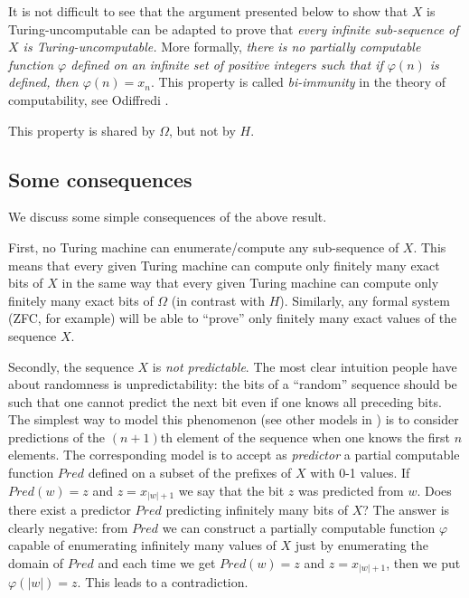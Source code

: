 \documentclass[pra,amsfonts,preprint,showkeys]{revtex4}
\begin{document}
It is not difficult to see that the argument presented below  to show that $X$
is Turing-uncomputable can be adapted to prove that {\it every infinite sub-sequence of $X$ is Turing-uncomputable.}
More formally, {\it there is no partially computable function $\varphi$
defined on an infinite set of positive integers such that if $\varphi (n)$ is defined, then $\varphi (n) = x_{n}$}. This property is called {\it bi-immunity} in the theory of computability, see Odiffredi \cite{odi:99}.

This property is shared by $\Omega$, but not by $H$.




\subsection{Some consequences}

We discuss some simple consequences of the above result.

First, no Turing machine can enumerate/compute any sub-sequence
of  $X$. This means that every given Turing machine can compute only finitely many exact bits of $X$ in the same way that every given Turing machine can compute only finitely many exact bits of $\Omega$ (in contrast with $H$). Similarly, any formal system (ZFC, for example) will be able to ``prove'' only finitely many exact values of the sequence $X$.





Secondly, the sequence $X$ is {\it not predictable}. The most clear intuition people  have about randomness is unpredictability:
the  bits of a ``random'' sequence  should be such that one cannot predict the next bit even if one knows all preceding bits.  The simplest way to model this phenomenon (see  other models in \cite{DH}) is to consider
predictions of the $(n+1)$th element of the sequence when one knows the first $n$ elements. The corresponding model is to accept as  {\it predictor} a partial computable function $Pred$ defined on  a subset of the prefixes of $X$
 with 0-1 values.  If $Pred(w)= z$ and $z= x_{|w|+1}$ we say that the bit $z$
 was predicted from  $w$.
Does there
exist a predictor $Pred$ predicting infinitely many bits of $X$? The answer is clearly negative: from $Pred$ we can construct a partially computable function $\varphi$ capable of enumerating infinitely many
values of $X$ just by enumerating the domain of $Pred$ and each
time we get $Pred(w)= z$ and $z= x_{|w|+1}$, then we put $\varphi (|w|)=z$. This leads to a contradiction.
\end{document}

